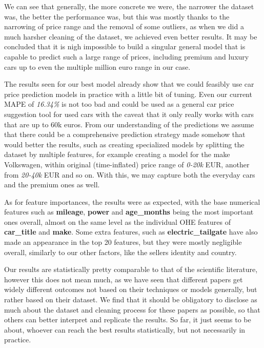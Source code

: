 \documentclass[12pt]{article}
\begin{document}
We can see that generally, the more concrete we were, the narrower the dataset was, the better the performance was, but this was mostly thanks to the narrowing of price range and the removal of some outliers, as when we did a much harsher cleaning of the dataset, we achieved even better results.
It may be concluded that it is nigh impossible to build a singular general model that is capable to predict such a large range of prices, including premium and luxury cars up to even the multiple million euro range in our case.

The results seen for our best model already show that we could feasibly use car price prediction models in practice with a little bit of tuning.
Even our current MAPE of \textit{16.34\%} is not too bad and could be used as a general car price suggestion tool for used cars with the caveat that it only really works with cars that are up to 60k euros.
From our understanding of the predictions we assume that there could be a comprehensive prediction strategy made somehow that would better the results, such as creating specialized models by splitting the dataset by multiple features, for example creating a model for the make Volkswagen, within original (time-inflated) price range of \textit{0-20k} EUR, another from \textit{20-40k} EUR and so on.
With this, we may capture both the everyday cars and the premium ones as well.

As for feature importances, the results were as expected, with the base numerical features such as \textbf{mileage}, \textbf{power} and \textbf{age\_months} being the most important ones overall, almost on the same level as the individual OHE features of \textbf{car\_title} and \textbf{make}.
Some extra features, such as \textbf{electric\_tailgate} have also made an appearance in the top 20 features, but they were mostly negligible overall, similarly to our other factors, like the sellers identity and country.

Our results are statistically pretty comparable to that of the scientific literature, however this does not mean much, as we have seen that different papers get widely different outcomes not based on their techniques or models generally, but rather based on their dataset.
We find that it should be obligatory to disclose as much about the dataset and cleaning process for these papers as possible, so that others can better interpret and replicate the results.
So far, it just seems to be about, whoever can reach the best results statistically, but not necessarily in practice.
\end{document}

